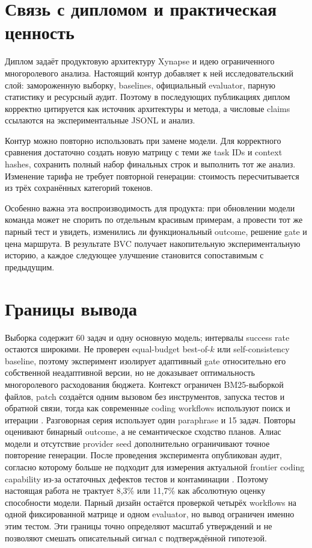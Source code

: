 \documentclass[11pt]{article}
\begin{document}
\section{Связь с дипломом и практическая ценность}

Диплом \cite{khalilov2026} задаёт продуктовую архитектуру Xynapse и идею
ограниченного многоролевого анализа. Настоящий контур добавляет к ней
исследовательский слой: замороженную выборку, baselines, официальный
evaluator, парную статистику и ресурсный аудит. Поэтому в последующих
публикациях диплом корректно цитируется как источник архитектуры и метода,
а числовые claims ссылаются на экспериментальные JSONL и анализ.

Контур можно повторно использовать при замене модели. Для корректного
сравнения достаточно создать новую матрицу с теми же task IDs и context
hashes, сохранить полный набор финальных строк и выполнить тот же анализ.
Изменение тарифа не требует повторной генерации: стоимость пересчитывается
из трёх сохранённых категорий токенов.

Особенно важна эта воспроизводимость для продукта: при обновлении модели
команда может не спорить по отдельным красивым примерам, а провести тот же
парный тест и увидеть, изменились ли функциональный outcome, решение gate и
цена маршрута. В результате BVC получает накопительную экспериментальную
историю, а каждое следующее улучшение становится сопоставимым с предыдущим.

\section{Границы вывода}

Выборка содержит 60 задач и одну основную модель; интервалы success rate
остаются широкими. Не проверен equal-budget best-of-\(k\) или self-consistency
baseline, поэтому эксперимент изолирует адаптивный gate относительно его
собственной неадаптивной версии, но не доказывает оптимальность многоролевого
расходования бюджета. Контекст ограничен BM25-выборкой файлов, patch создаётся
одним вызовом без инструментов, запуска тестов и обратной связи, тогда как
современные coding workflows используют поиск и итерации
\cite{xia2024agentless,yang2024sweagent}. Разговорная серия использует один
paraphrase и 15 задач. Повторы оценивают бинарный outcome, а не семантическое
сходство планов. Алиас модели  и отсутствие provider seed
дополнительно ограничивают точное повторение генерации.
После проведения эксперимента опубликован аудит, согласно которому
\dataset{} больше не подходит для измерения актуальной frontier coding
capability из-за остаточных дефектов тестов и контаминации
\cite{openai2026verifiedlimits}. Поэтому настоящая работа не трактует
8,3\% или 11,7\% как абсолютную оценку способности модели. Парный дизайн
остаётся проверкой четырёх workflows на одной фиксированной матрице и одном
evaluator, но вывод ограничен именно этим тестом. Эти границы точно определяют
масштаб утверждений и не позволяют смешать описательный сигнал с
подтверждённой гипотезой.
\end{document}
